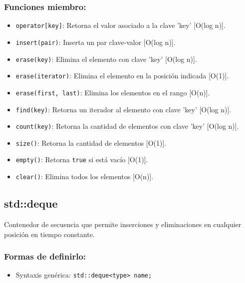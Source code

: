 \subsubsection*{Funciones miembro:}
\begin{itemize}
  \item \texttt{operator[key]}: Retorna el valor asociado a la clave 'key' [O(log n)].
  \item \texttt{insert(pair)}: Inserta un par clave-valor [O(log n)]. 
  \item \texttt{erase(key)}: Elimina el elemento con clave 'key' [O(log n)].
  \item \texttt{erase(iterator)}: Elimina el elemento en la posición indicada [O(1)].
  \item \texttt{erase(first, last)}: Elimina los elementos en el rango [O(n)].
  \item \texttt{find(key)}: Retorna un iterador al elemento con clave 'key' [O(log n)]. 
  \item \texttt{count(key)}: Retorna la cantidad de elementos con clave 'key' [O(log n)]. 
  \item \texttt{size()}: Retorna la cantidad de elementos [O(1)]. 
  \item \texttt{empty()}: Retorna \texttt{true} si está vacío [O(1)]. 
  \item \texttt{clear()}: Elimina todos los elementos [O(n)]. 
\end{itemize}

\subsection{std::deque}
\label{subsec:std_deque}
Contenedor de secuencia que permite inserciones y eliminaciones en cualquier posición en tiempo constante.

\subsubsection*{Formas de definirlo:}
\begin{itemize}
  \item Syntaxis genérica: \texttt{std::deque<type> name;}
\end{itemize}

